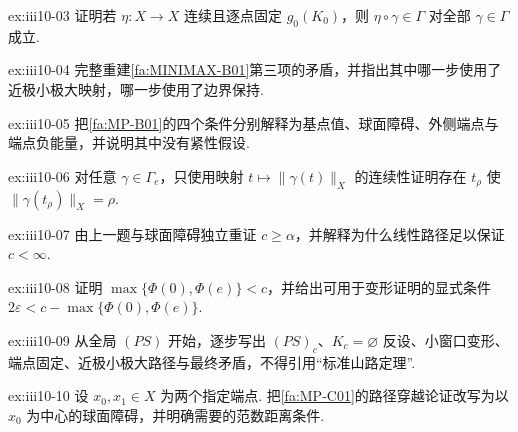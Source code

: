 \begin{FAExercise}[边界保持变形]{ex:iii10-03}
证明若 \(\displaystyle\eta:X\to X\) 连续且逐点固定 \(\displaystyle g_0(K_0)\)，则 \(\displaystyle\eta\circ\gamma\in\Gamma\) 对全部 \(\displaystyle\gamma\in\Gamma\) 成立.
\end{FAExercise}

\begin{FAExercise}[一般极小极大变形框架的阻碍]{ex:iii10-04}
完整重建\autoref{fa:MINIMAX-B01}第三项的矛盾，并指出其中哪一步使用了近极小极大映射，哪一步使用了边界保持.
\end{FAExercise}

\begin{FAExercise}[山路几何]{ex:iii10-05}
把\autoref{fa:MP-B01}的四个条件分别解释为基点值、球面障碍、外侧端点与端点负能量，并说明其中没有紧性假设.
\end{FAExercise}

\begin{FAExercise}[路径穿过球面]{ex:iii10-06}
对任意 \(\displaystyle\gamma\in\Gamma_e\)，只使用映射 \(\displaystyle t\mapsto\|\gamma(t)\|_X\) 的连续性证明存在 \(\displaystyle t_\rho\) 使 \(\displaystyle\|\gamma(t_\rho)\|_X=\rho\).
\end{FAExercise}

\begin{FAExercise}[山路极小极大基本估计的下界]{ex:iii10-07}
由上一题与球面障碍独立重证 \(\displaystyle c\geqslant\alpha\)，并解释为什么线性路径足以保证 \(\displaystyle c<\infty\).
\end{FAExercise}

\begin{FAExercise}[端点能量间隙]{ex:iii10-08}
证明 \(\displaystyle\max\{\Phi(0),\Phi(e)\}<c\)，并给出可用于变形证明的显式条件 \(\displaystyle2\varepsilon<c-\max\{\Phi(0),\Phi(e)\}\).
\end{FAExercise}

\begin{FAExercise}[完整重建山路定理的变形矛盾]{ex:iii10-09}
从全局 \(\displaystyle(PS)\) 开始，逐步写出 \(\displaystyle(PS)_c\)、\(\displaystyle K_c=\varnothing\) 反设、小窗口变形、端点固定、近极小极大路径与最终矛盾，不得引用“标准山路定理”.
\end{FAExercise}

\begin{FAExercise}[基点/路径变体]{ex:iii10-10}
设 \(\displaystyle x_0,x_1\in X\) 为两个指定端点. 把\autoref{fa:MP-C01}的路径穿越论证改写为以 \(\displaystyle x_0\) 为中心的球面障碍，并明确需要的范数距离条件.
\end{FAExercise}

